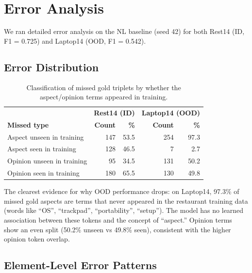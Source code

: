 \documentclass[12pt,a4paper]{report}
\begin{document}
\section{Error Analysis}\label{sec:errors}

We ran detailed error analysis on the NL baseline (seed 42) for both Rest14 (ID, F1 = 0.725) and Laptop14 (OOD, F1 = 0.542).

\subsection{Error Distribution}

\begin{table}[H]
\centering
\caption{Classification of missed gold triplets by whether the aspect/opinion terms appeared in training.}
\label{tab:errors-missed}
\small
\begin{tabular}{@{}lrrrr@{}}
\toprule
& \multicolumn{2}{c}{\textbf{Rest14 (ID)}} & \multicolumn{2}{c}{\textbf{Laptop14 (OOD)}} \\
\textbf{Missed type} & \textbf{Count} & \textbf{\%} & \textbf{Count} & \textbf{\%} \\
\midrule
Aspect unseen in training & 147 & 53.5 & 254 & 97.3 \\
Aspect seen in training & 128 & 46.5 & 7 & 2.7 \\
\midrule
Opinion unseen in training & 95 & 34.5 & 131 & 50.2 \\
Opinion seen in training & 180 & 65.5 & 130 & 49.8 \\
\bottomrule
\end{tabular}
\end{table}

The clearest evidence for why OOD performance drops: on Laptop14, 97.3\% of missed gold aspects are terms that never appeared in the restaurant training data (words like ``OS'', ``trackpad'', ``portability'', ``setup''). The model has no learned association between these tokens and the concept of ``aspect.'' Opinion terms show an even split (50.2\% unseen vs 49.8\% seen), consistent with the higher opinion token overlap.

\subsection{Element-Level Error Patterns}
\end{document}
